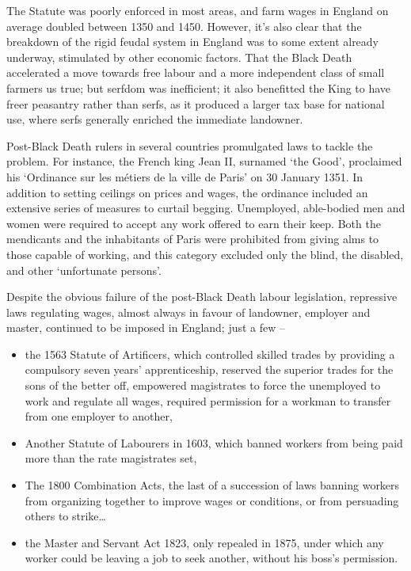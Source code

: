 \documentclass[
  letterpaper,
  11pt,
  DIV=9,
  openright]{scrbook}
\providecommand{\tightlist}{%
  \setlength{\itemsep}{0pt}\setlength{\parskip}{0pt}}
\begin{document}
The Statute was poorly enforced in most areas, and farm wages in England
on average doubled between 1350 and 1450. However, it's also clear that
the breakdown of the rigid feudal system in England was to some extent
already underway, stimulated by other economic factors. That the Black
Death accelerated a move towards free labour and a more independent
class of small farmers us true; but serfdom was inefficient; it also
benefitted the King to have freer peasantry rather than serfs, as it
produced a larger tax base for national use, where serfs generally
enriched the immediate landowner.

Post-Black Death rulers in several countries promulgated laws to tackle
the problem. For instance, the French king Jean II, surnamed `the Good',
proclaimed his `Ordinance sur les métiers de la ville de Paris' on 30
January 1351. In addition to setting ceilings on prices and wages, the
ordinance included an extensive series of measures to curtail begging.
Unemployed, able-bodied men and women were required to accept any work
offered to earn their keep. Both the mendicants and the inhabitants of
Paris were prohibited from giving alms to those capable of working, and
this category excluded only the blind, the disabled, and other
`unfortunate persons'.

Despite the obvious failure of the post-Black Death labour legislation,
repressive laws regulating wages, almost always in favour of landowner,
employer and master, continued to be imposed in England; just a few --

\begin{itemize}
\tightlist
\item
  the 1563 Statute of Artificers, which controlled skilled trades by
  providing a compulsory seven years' apprenticeship, reserved the
  superior trades for the sons of the better off, empowered magistrates
  to force the unemployed to work and regulate all wages, required
  permission for a workman to transfer from one employer to another,
\item
  Another Statute of Labourers in 1603, which banned workers from being
  paid more than the rate magistrates set,
\item
  The 1800 Combination Acts, the last of a succession of laws banning
  workers from organizing together to improve wages or conditions, or
  from persuading others to strike\ldots{}
\item
  the Master and Servant Act 1823, only repealed in 1875, under which
  any worker could be leaving a job to seek another, without his boss's
  permission.
\end{itemize}
\end{document}
